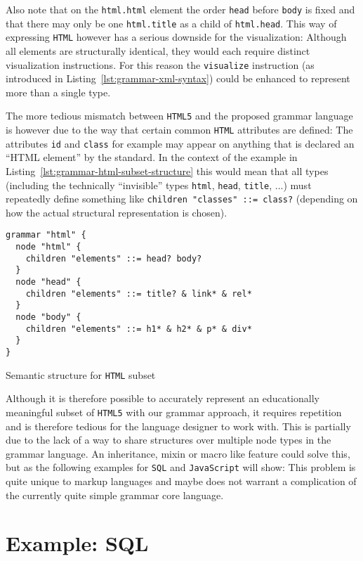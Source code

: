 \documentclass[sigconf,natbib=false]{acmart}
\begin{document}
Also note that on the \texttt{html.html} element the order \texttt{head} before \texttt{body} is fixed and that there may only be one \texttt{html.title} as a child of \texttt{html.head}. This way of expressing \texttt{HTML} however has a serious downside for the visualization: Although all elements are structurally identical, they would each require distinct visualization instructions. For this reason the \texttt{visualize} instruction (as introduced in Listing~\ref{lst:grammar-xml-syntax}) could be enhanced to represent more than a single type.

The more tedious mismatch between \texttt{HTML5} and the proposed grammar language is however due to the way that certain common \texttt{HTML} attributes are defined: The attributes \texttt{id} and \texttt{class} for example may appear on anything that is declared an \enquote{HTML element} by the standard. In the context of the example in Listing~\ref{lst:grammar-html-subset-structure} this would mean that all types (including the technically \enquote{invisible} types \texttt{html}, \texttt{head}, \texttt{title}, ...) must repeatedly define something like \texttt{children "classes" ::= class?} (depending on how the actual structural representation is chosen).

\begin{listing}[H]
\begin{verbatim}
grammar "html" {
  node "html" {
    children "elements" ::= head? body?
  }
  node "head" {
    children "elements" ::= title? & link* & rel*
  }
  node "body" {
    children "elements" ::= h1* & h2* & p* & div*
  }
}
\end{verbatim}
\caption{Semantic structure for \texttt{HTML} subset}
\label{lst:grammar-html-subset-structure}
\end{listing}

Although it is therefore possible to accurately represent an educationally meaningful subset of \texttt{HTML5} with our grammar approach, it requires repetition and is therefore tedious for the language designer to work with. This is partially due to the lack of a way to share structures over multiple node types in the grammar language. An inheritance, mixin or macro like feature could solve this, but as the following examples for \texttt{SQL} and \texttt{JavaScript} will show: This problem is quite unique to markup languages and maybe does not warrant a complication of the currently quite simple grammar core language.

\section{Example: SQL}
\end{document}
